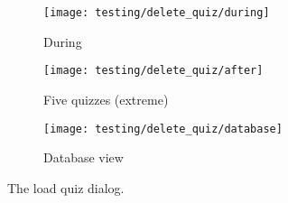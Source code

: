 \begin{figure}[!htbp]
\centering
\begin{subfigure}{0.5\textwidth}
  \centering
  \texttt{[image: testing/delete\_quiz/during]}
  \caption{During}
  \label{fig:sub1}
\end{subfigure}%
\begin{subfigure}{0.5\textwidth}
  \centering
  \texttt{[image: testing/delete\_quiz/after]}
  \caption{Five quizzes (extreme)}
  \label{fig:sub2}
\end{subfigure}
\begin{subfigure}{0.5\textwidth}
  \centering
  \texttt{[image: testing/delete\_quiz/database]}
  \caption{Database view}
  \label{fig:sub2}
\end{subfigure}
\caption{The load quiz dialog.}
\label{fig:test}
\end{figure}
